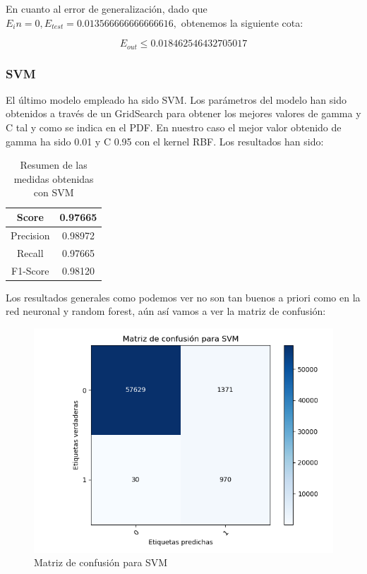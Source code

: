En cuanto al error de generalización, dado que $E_in=0, E_{test} = 0.013566666666666616,$ obtenemos la siguiente cota:

$$E_{out} \leq 0.018462546432705017$$

\subsubsection{SVM}

El último modelo empleado ha sido SVM. Los parámetros del modelo han sido obtenidos a través de un GridSearch para obtener los mejores valores de gamma y C tal y como se indica en el PDF. En nuestro caso el mejor valor obtenido de gamma ha sido 0.01 y C 0.95 con el kernel RBF. Los resultados han sido:

\begin{table}[H]
	\centering
	\begin{tabular}{|c|c|}
		\hline
		Score     & 0.97665   \\ \hline
		Precision & 0.98972  \\ \hline
		Recall    & 0.97665   \\ \hline
		F1-Score  & 0.98120 \\ \hline
	\end{tabular}
	\caption{Resumen de las medidas obtenidas con SVM}
\end{table}

Los resultados generales como podemos ver no son tan buenos a priori como en la red neuronal y random forest, aún así vamos a ver la matriz de confusión:

\begin{figure}[H] %
	\centering
	\includegraphics[scale=0.6]{SVM-CONF.png}  %
	\caption{Matriz de confusión para SVM} 
	\label{fig:conf-svm}
\end{figure}

